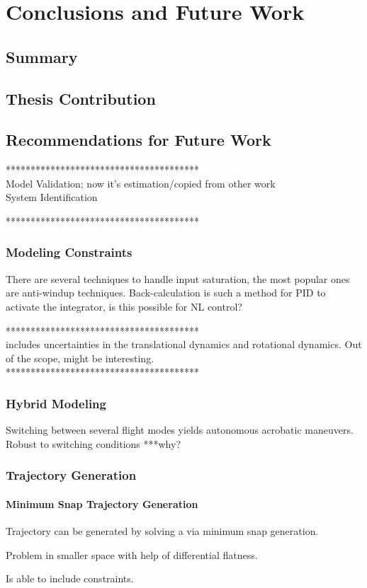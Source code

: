 \chapter{Conclusions and Future Work}\label{ch:conclusion}
\section{Summary}

\section{Thesis Contribution}

\section{Recommendations for Future Work}\label{ch:future}
***************************************\\
Model Validation; now it's estimation/copied from other work\\ 
System Identification

***************************************\\
\subsection{Modeling Constraints}
There are several techniques to handle input saturation, the most popular ones are anti-windup techniques. Back-calculation is such a method for PID to activate the integrator, is this possible for NL control?

***************************************\\
\cite{Goodarzi2013a} includes uncertainties in the translational dynamics and rotational dynamics. Out of the scope, might be interesting.\\
***************************************\\

\subsection{Hybrid Modeling}
Switching between several flight modes yields autonomous acrobatic maneuvers. Robust to switching conditions ***why?\\

\subsection{Trajectory Generation}
\subsubsection{Minimum Snap Trajectory Generation}

Trajectory can be generated by solving a  via minimum snap generation.

Problem in smaller space with help of differential flatness.

Is able to include constraints.
